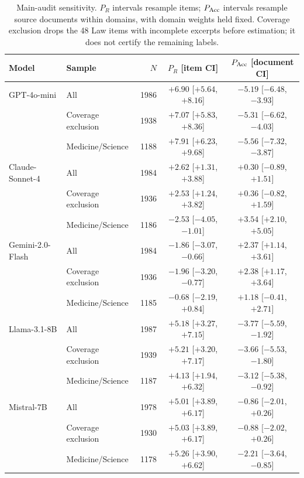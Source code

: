 \begin{table}[t]
\caption{Main-audit sensitivity. $P_R$ intervals resample items; $P_{\rm Acc}$ intervals resample source documents within domains, with domain weights held fixed. Coverage exclusion drops the 48 Law items with incomplete excerpts before estimation; it does not certify the remaining labels.}
\label{tab:coverage_sensitivity}
\centering\small
\setlength{\tabcolsep}{3.5pt}
\begin{tabular}{llrcc}
\toprule
Model & Sample & $N$ & $P_R$ [item CI] & $P_{\rm Acc}$ [document CI] \\
\midrule
GPT-4o-mini & All & 1986 & $+6.90$ [$+5.64$, $+8.16$] & $-5.19$ [$-6.48$, $-3.93$] \\
 & Coverage exclusion & 1938 & $+7.07$ [$+5.83$, $+8.36$] & $-5.31$ [$-6.62$, $-4.03$] \\
 & Medicine/Science & 1188 & $+7.91$ [$+6.23$, $+9.68$] & $-5.56$ [$-7.32$, $-3.87$] \\
Claude-Sonnet-4 & All & 1984 & $+2.62$ [$+1.31$, $+3.88$] & $+0.30$ [$-0.89$, $+1.51$] \\
 & Coverage exclusion & 1936 & $+2.53$ [$+1.24$, $+3.82$] & $+0.36$ [$-0.82$, $+1.59$] \\
 & Medicine/Science & 1186 & $-2.53$ [$-4.05$, $-1.01$] & $+3.54$ [$+2.10$, $+5.05$] \\
Gemini-2.0-Flash & All & 1984 & $-1.86$ [$-3.07$, $-0.66$] & $+2.37$ [$+1.14$, $+3.61$] \\
 & Coverage exclusion & 1936 & $-1.96$ [$-3.20$, $-0.77$] & $+2.38$ [$+1.17$, $+3.64$] \\
 & Medicine/Science & 1185 & $-0.68$ [$-2.19$, $+0.84$] & $+1.18$ [$-0.41$, $+2.71$] \\
Llama-3.1-8B & All & 1987 & $+5.18$ [$+3.27$, $+7.15$] & $-3.77$ [$-5.59$, $-1.92$] \\
 & Coverage exclusion & 1939 & $+5.21$ [$+3.20$, $+7.17$] & $-3.66$ [$-5.53$, $-1.80$] \\
 & Medicine/Science & 1187 & $+4.13$ [$+1.94$, $+6.32$] & $-3.12$ [$-5.38$, $-0.92$] \\
Mistral-7B & All & 1978 & $+5.01$ [$+3.89$, $+6.17$] & $-0.86$ [$-2.01$, $+0.26$] \\
 & Coverage exclusion & 1930 & $+5.03$ [$+3.89$, $+6.17$] & $-0.88$ [$-2.02$, $+0.26$] \\
 & Medicine/Science & 1178 & $+5.26$ [$+3.90$, $+6.62$] & $-2.21$ [$-3.64$, $-0.85$] \\
\bottomrule
\end{tabular}
\end{table}
